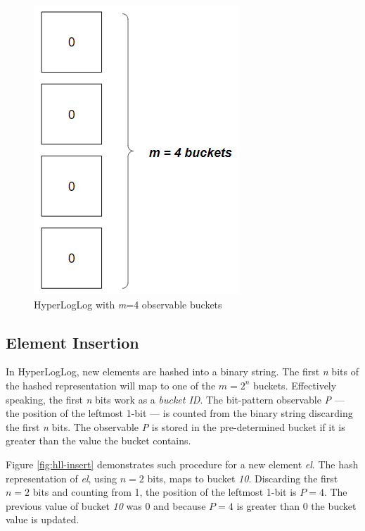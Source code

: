 \begin{figure}[!htb]
    \begin{center}
       \hspace{0.5in}
      \includegraphics[scale=0.6]{figures/hll-ds.png}
      \caption[HyperLogLog initial state]{HyperLogLog with \textit{m}=4 observable buckets}
      \label{fig:hll-ds}
    \end{center}
\end{figure}


\subsection*{Element Insertion}
In HyperLogLog, new elements are hashed into a binary string. The first \textit{n} bits of the hashed representation will map to one of the $m=2^n$ buckets. Effectively speaking, the first \textit{n} bits work as a \textit{bucket ID}. The bit-pattern observable \textit{P} --- the position of the leftmost 1-bit --- is counted from the binary string discarding the first \textit{n} bits. The observable \textit{P} is stored in the pre-determined bucket if it is greater than the value the bucket contains. 

Figure \ref{fig:hll-insert} demonstrates such procedure for a new element \textit{el}. The hash representation of \textit{el}, using $n=2$ bits, maps to bucket \textit{10}. Discarding the first $n=2$ bits and counting from 1, the position of the leftmost 1-bit is $P=4$. The previous value of bucket \textit{10} was 0 and because $P=4$ is greater than 0 the bucket value is updated.


